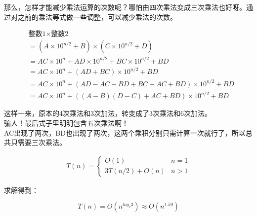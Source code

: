 那么，怎样才能减少乘法运算的次数呢？哪怕由四次乘法变成三次乘法也好呀。通过对之前的乘法等式做一些调整，可以减少乘法的次数。

\vspace{-1cm}

\begin{align*}
	 & \text{整数1} \times \text{整数2}                                      \\
	 & = (A \times 10^{n/2} + B) \times (C \times 10^{n/2} + D)              \\
	 & = AC \times 10^n + AD \times 10^{n/2} + BC \times 10^{n/2} + BD       \\
	 & = AC \times 10^n + (AD + BC) \times 10^{n/2} + BD                     \\
	 & = AC \times 10^n + (AD - AC - BD + BC + AC + BD) \times 10^{n/2} + BD \\
	 & = AC \times 10^n + ((A - B)(D - C) + AC + BD) \times 10^{n/2} + BD
\end{align*}

这样一来，原本的4次乘法和3次加法，转变成了3次乘法和6次加法。\\

骗人！最后式子里明明包含五次乘法啊！\\

AC出现了两次，BD也出现了两次，这两个乘积分别只需计算一次就行了，所以总共只需要三次乘法。

\vspace{-0.5cm}

\begin{align*}
	T(n) = \begin{cases}
		O(1)           & n = 1 \\
		3T(n/2) + O(n) & n > 1
	\end{cases}
\end{align*}

求解得到：

\vspace{-0.5cm}

$$
	T(n) = O(n^{log_2{3}}) \approx O(n^{1.59})
$$

\vspace{0.5cm}


